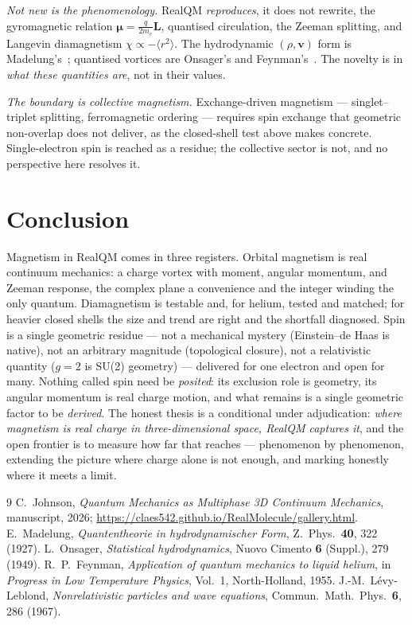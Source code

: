 \documentclass[11pt]{article}
\begin{document}
\emph{Not new is the phenomenology.} RealQM \emph{reproduces}, it does not rewrite, the gyromagnetic relation
$\boldsymbol\mu=\tfrac{q}{2m_e}\mathbf L$, quantised circulation, the Zeeman splitting, and Langevin diamagnetism
$\chi\propto-\langle r^2\rangle$. The hydrodynamic $(\rho,\mathbf v)$ form is Madelung's~\cite{Madelung};
quantised vortices are Onsager's and Feynman's~\cite{Onsager,Feynman}. The novelty is in \emph{what these
quantities are}, not in their values.

\emph{The boundary is collective magnetism.} Exchange-driven magnetism --- singlet--triplet splitting,
ferromagnetic ordering --- requires spin exchange that geometric non-overlap does not deliver, as the closed-shell
test above makes concrete. Single-electron spin is reached as a residue; the collective sector is not, and no
perspective here resolves it.

\section{Conclusion}
\label{sec:concl}

Magnetism in RealQM comes in three registers. Orbital magnetism is real continuum mechanics: a charge vortex with
moment, angular momentum, and Zeeman response, the complex plane a convenience and the integer winding the only
quantum. Diamagnetism is testable and, for helium, tested and matched; for heavier closed shells the size and
trend are right and the shortfall diagnosed. Spin is a single geometric residue --- not a mechanical mystery
(Einstein--de Haas is native), not an arbitrary magnitude (topological closure), not a relativistic quantity
($g=2$ is SU(2) geometry) --- delivered for one electron and open for many. Nothing called spin need be
\emph{posited}: its exclusion role is geometry, its angular momentum is real charge motion, and what remains is a
single geometric factor to be \emph{derived}. The honest thesis is a conditional under adjudication: \emph{where
magnetism is real charge in three-dimensional space, RealQM captures it}, and the open frontier is to measure how
far that reaches --- phenomenon by phenomenon, extending the picture where charge alone is not enough, and marking
honestly where it meets a limit.

\begin{thebibliography}{9}
 C.~Johnson, \emph{Quantum Mechanics as Multiphase 3D Continuum Mechanics}, manuscript, 2026;
\url{https://claes542.github.io/RealMolecule/gallery.html}.
 E.~Madelung, \emph{Quantentheorie in hydrodynamischer Form}, Z.\ Phys.\ \textbf{40}, 322
(1927).
 L.~Onsager, \emph{Statistical hydrodynamics}, Nuovo Cimento \textbf{6} (Suppl.), 279 (1949).
 R.~P.~Feynman, \emph{Application of quantum mechanics to liquid helium}, in \emph{Progress in
Low Temperature Physics}, Vol.~1, North-Holland, 1955.
 J.-M.~Lévy-Leblond, \emph{Nonrelativistic particles and wave equations}, Commun.\ Math.\
Phys.\ \textbf{6}, 286 (1967).
\end{thebibliography}
\end{document}
